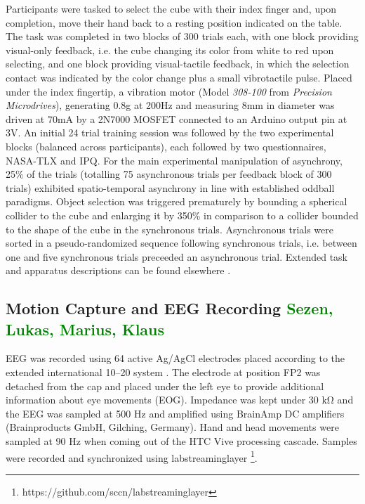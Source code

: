 Participants were tasked to select the cube with their index finger and, upon completion, move their hand back to a resting position indicated on the table. The task was completed in two blocks of 300 trials each, with one block providing visual-only feedback, i.e. the cube changing its color from white to red upon selecting, and one block providing visual-tactile feedback, in which the selection contact was indicated by the color change plus a small vibrotactile pulse. Placed under the index fingertip, a vibration motor (Model \textit{308-100} from \textit{Precision Microdrives}), generating 0.8g at 200Hz and measuring 8mm in diameter was driven at 70mA by a 2N7000 MOSFET connected to an Arduino output pin at 3V. An initial 24 trial training session was followed by the two experimental blocks (balanced across participants), each followed by two questionnaires, NASA-TLX and IPQ. For the main experimental manipulation of asynchrony, 25\% of the trials (totalling 75 asynchronous trials per feedback block of 300 trials) exhibited spatio-temporal asynchrony in line with established oddball paradigms. Object selection was triggered prematurely by bounding a spherical collider to the cube and enlarging it by 350\% in comparison to a collider bounded to the shape of the cube in the synchronous trials. Asynchronous trials were sorted in a pseudo-randomized sequence following synchronous trials, i.e. between one and five synchronous trials preceeded an asynchronous trial. Extended task and apparatus descriptions can be found elsewhere \cite{Gehrke2019}.

\subsection{Motion Capture and EEG Recording \textcolor{green}{Sezen, Lukas, Marius, Klaus}}
EEG was recorded using 64 active Ag/AgCl electrodes placed according to the extended international 10–20 system \cite{Chatrian1985a}. The electrode at position FP2 was detached from the cap and placed under the left eye to provide additional information about eye movements (EOG). Impedance was kept under 30 \si{\kohm} and the EEG was sampled at 500 Hz and amplified using BrainAmp DC amplifiers (Brainproducts GmbH, Gilching, Germany). Hand and head movements were sampled at 90 Hz when coming out of the HTC Vive processing cascade. Samples were recorded and synchronized using labstreaminglayer \footnote{https://github.com/sccn/labstreaminglayer}.